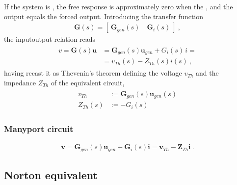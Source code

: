 \documentclass[letterpaper,10pt,english]{jupyterBook}
\begin{document}
\sphinxAtStartPar
If the system is , the free response is approximately zero when the , and the output equals the forced output. Introducing the transfer function
\begin{equation*}
\begin{split}\mathbf{G}(s) = [ \ \mathbf{G}_{gen}(s) \quad \mathbf{G}_i(s) \ ] \ ,\end{split}
\end{equation*}
\sphinxAtStartPar
the input\sphinxhyphen{}output relation reads
\begin{equation*}
\begin{split}\begin{aligned}
   v = \mathbf{G}(s) \mathbf{u}
   & = \mathbf{G}_{gen}(s) \mathbf{u}_{gen} + G_i(s) \, i = \\
   & = v_{Th}(s) - Z_{Th}(s) i(s) \ ,
\end{aligned}\end{split}
\end{equation*}
\sphinxAtStartPar
having recast it as Thevenin’s theorem defining the voltage \(v_{Th}\) and the impedance \(Z_{Th}\) of the equivalent circuit,
\begin{equation*}
\begin{split}\begin{aligned}
   v_{Th} & := \mathbf{G}_{gen}(s) \mathbf{u}_{gen}(s) \\
   Z_{Th}(s) & := - G_i(s)
\end{aligned}\end{split}
\end{equation*}

\subsubsection{Many\sphinxhyphen{}port circuit}
\label{\detokenize{ch/electrical-engineering-networks-linear:many-port-circuit}}\label{\detokenize{ch/electrical-engineering-networks-linear:classical-electromagnetism-electrical-engineering-newtork-analysis-thevenin-n-port}}\begin{equation*}
\begin{split}\mathbf{v} = \mathbf{G}_{gen}(s) \mathbf{u}_{gen} + \mathbf{G}_i(s) \mathbf{i} = \mathbf{v}_{Th} - \mathbf{Z}_{Th} \mathbf{i} \ .\end{split}
\end{equation*}

\subsection{Norton equivalent}
\label{\detokenize{ch/electrical-engineering-networks-linear:norton-equivalent}}\label{\detokenize{ch/electrical-engineering-networks-linear:classical-electromagnetism-electrical-engineering-newtork-analysis-norton}}
\sphinxstepscope
\end{document}
